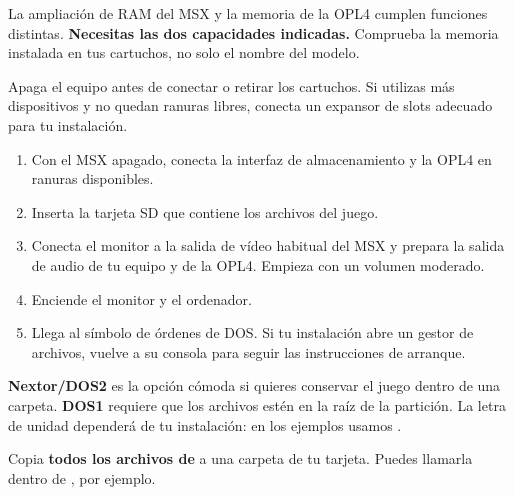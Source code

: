 La ampliación de RAM del MSX y la memoria de la OPL4 cumplen funciones distintas. \textbf{Necesitas las dos capacidades indicadas.} Comprueba la memoria instalada en tus cartuchos, no solo el nombre del modelo.

Apaga el equipo antes de conectar o retirar los cartuchos. Si utilizas más dispositivos y no quedan ranuras libres, conecta un expansor de slots adecuado para tu instalación.


\begin{enumerate}
\item Con el MSX apagado, conecta la interfaz de almacenamiento y la OPL4 en ranuras disponibles.
\item Inserta la tarjeta SD que contiene los archivos del juego.
\item Conecta el monitor a la salida de vídeo habitual del MSX y prepara la salida de audio de tu equipo y de la OPL4. Empieza con un volumen moderado.
\item Enciende el monitor y el ordenador.
\item Llega al símbolo de órdenes de DOS. Si tu instalación abre un gestor de archivos, vuelve a su consola para seguir las instrucciones de arranque.
\end{enumerate}


\textbf{Nextor/DOS2} es la opción cómoda si quieres conservar el juego dentro de una carpeta. \textbf{DOS1} requiere que los archivos estén en la raíz de la partición. La letra de unidad dependerá de tu instalación: en los ejemplos usamos .

Copia \textbf{todos los archivos de } a una carpeta de tu tarjeta. Puedes llamarla  dentro de , por ejemplo.

